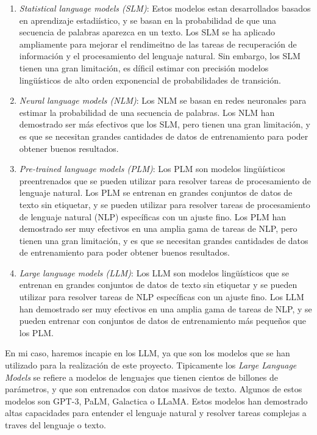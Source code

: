 \begin{enumerate}
    \item \textit{Statistical language models (SLM)}: Estos modelos estan desarrollados basados en aprendizaje
        estadiístico, y se basan en la probabilidad de que una secuencia de palabras aparezca en un texto. Los 
        SLM se ha aplicado ampliamente para mejorar el rendimeitno de las tareas de recuperación de información
        y el procesamiento del lenguaje natural. Sin embargo, los SLM tienen una gran limitación, es díficil
        estimar con precisión modelos lingüísticos de alto orden exponencial de probabilidades de transición.
    \item \textit{Neural language models (NLM)}: Los NLM se basan en redes neuronales para estimar la probabilidad
        de una secuencia de palabras. Los NLM han demostrado ser más efectivos que los SLM, pero tienen una gran
        limitación, y es que se necesitan grandes cantidades de datos de entrenamiento para poder obtener buenos
        resultados.
    \item \textit{Pre-trained language models (PLM)}: Los PLM son modelos lingüísticos preentrenados que se pueden
        utilizar para resolver tareas de procesamiento de lenguaje natural. Los PLM se entrenan en grandes conjuntos
        de datos de texto sin etiquetar, y se pueden utilizar para resolver tareas de procesamiento de lenguaje
        natural (NLP) específicas con un ajuste fino. Los PLM han demostrado ser muy efectivos en una amplia gama
        de tareas de NLP, pero tienen una gran limitación, y es que se necesitan grandes cantidades de datos de
        entrenamiento para poder obtener buenos resultados.
    \item \textit{Large language models (LLM)}: Los LLM son modelos lingüísticos que se entrenan en grandes conjuntos
        de datos de texto sin etiquetar y se pueden utilizar para resolver tareas de NLP específicas con un ajuste
        fino. Los LLM han demostrado ser muy efectivos en una amplia gama de tareas de NLP, y se pueden entrenar
        con conjuntos de datos de entrenamiento más pequeños que los PLM.
\end{enumerate}

En mi caso, haremos incapie en los LLM, ya que son los modelos que se han utilizado para la realización de este
proyecto. Tipicamente los \textit{Large Language Models} se refiere a modelos de lenguajes que 
tienen cientos de billones de parámetros, y que son entrenados con datos masivos de texto.
Algunos de estos modelos son GPT-3, PaLM, Galactica o LLaMA. Estos modelos han demostrado altas
capacidades para entender el lenguaje natural y resolver tareas complejas a traves del lenguaje o texto.

